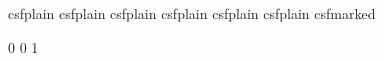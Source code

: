 %
%
\providecommand{\csfHL}[1]{\csname csfhl@#1\endcsname}
\providecommand{\csfSetHighlight}[1]{%
  \expandafter\gdef\csname csfhl@I\endcsname{csfplain}%
  \expandafter\gdef\csname csfhl@II\endcsname{csfplain}%
  \expandafter\gdef\csname csfhl@III\endcsname{csfplain}%
  \expandafter\gdef\csname csfhl@IV\endcsname{csfplain}%
  \expandafter\gdef\csname csfhl@V\endcsname{csfplain}%
  \expandafter\gdef\csname csfhl@none\endcsname{csfplain}%
  \expandafter\gdef\csname csfhl@#1\endcsname{csfmarked}%
}
\csfSetHighlight{none}

%
%
\providecommand{\csfSpineFinal}{\csname csfspine@final\endcsname}
\providecommand{\csfSetSpineReturn}[1]{%
  \expandafter\gdef\csname csfspine@current\endcsname{0}%
  \expandafter\gdef\csname csfspine@final\endcsname{0}%
  \expandafter\gdef\csname csfspine@#1\endcsname{1}%
}
\csfSetSpineReturn{current}

\providecommand{\PGtwo}[1]{\operatorname{PG}(2,#1)}
